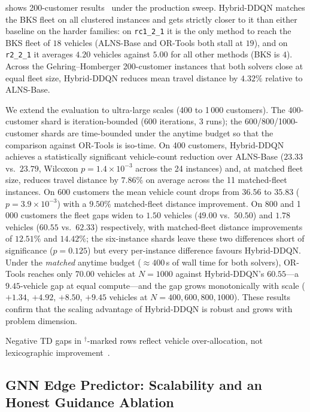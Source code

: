 \documentclass[conference]{IEEEtran}
\begin{document}
 shows 200-customer results~\cite{Gehring1999} under the
production sweep. Hybrid-DDQN matches the BKS fleet on all clustered instances and
gets strictly closer to it than either baseline on the harder families: on
\texttt{rc1\_2\_1} it is the only method to reach the BKS fleet of $18$ vehicles
(ALNS-Base and OR-Tools both stall at $19$), and on \texttt{r2\_2\_1} it averages
$4.20$ vehicles against $5.00$ for all other methods (BKS is $4$). Across the
Gehring--Homberger 200-customer instances that both solvers close at equal fleet
size, Hybrid-DDQN reduces mean travel distance by $4.32\%$ relative to ALNS-Base.

We extend the evaluation to ultra-large scales (400 to 1\,000 customers). The
400-customer shard is iteration-bounded (600 iterations, 3 runs); the
600/800/1000-customer shards are time-bounded under the anytime budget so that the
comparison against OR-Tools is iso-time. On 400 customers, Hybrid-DDQN achieves a
statistically significant vehicle-count reduction over ALNS-Base ($23.33$ vs.\
$23.79$, Wilcoxon $p=1.4{\times}10^{-3}$ across the 24 instances) and, at matched
fleet size, reduces travel distance by $7.86\%$ on average across the 11
matched-fleet instances. On 600 customers the mean vehicle count drops from
$36.56$ to $\mathbf{35.83}$ ($p=3.9{\times}10^{-3}$) with a $9.50\%$ matched-fleet
distance improvement. On 800 and 1\,000 customers the fleet gaps widen to $1.50$
vehicles ($49.00$ vs.\ $50.50$) and $\mathbf{1.78}$ vehicles ($60.55$ vs.\
$62.33$) respectively, with matched-fleet distance improvements of $12.51\%$ and
$14.42\%$; the six-instance shards leave these two differences short of
significance ($p=0.125$) but every per-instance difference favours Hybrid-DDQN.
Under the \emph{matched} anytime budget ($\approx 400$\,s of wall time for both
solvers), OR-Tools reaches only $70.00$ vehicles at $N{=}1000$ against Hybrid-DDQN's
$60.55$---a $9.45$-vehicle gap at equal compute---and the gap grows monotonically
with scale ($+1.34$, $+4.92$, $+8.50$, $+9.45$ vehicles at $N{=}400,600,800,1000$).
These results confirm that the scaling advantage of Hybrid-DDQN is robust and
grows with problem dimension.

Negative TD gaps in ${}^\dagger$-marked rows reflect vehicle over-allocation, not lexicographic
improvement~\cite{pisinger2007general}.
\subsection{GNN Edge Predictor: Scalability and an Honest Guidance Ablation}
\label{subsec:gnn_validation}
\end{document}
